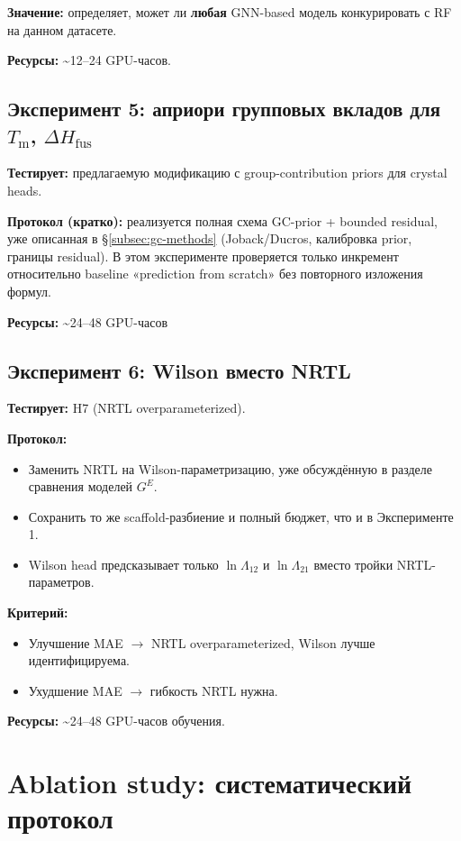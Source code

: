 \documentclass[11pt]{article}
\begin{document}
\textbf{Значение:} определяет, может ли \textbf{любая} GNN-based модель конкурировать с RF на данном датасете.

\textbf{Ресурсы:} \textasciitilde12--24 GPU-часов.

\subsection{Эксперимент 5: априори групповых вкладов для $T_{\mathrm{m}}$, $\Delta H_{\mathrm{fus}}$}
\label{subsec:exp-gc-priors}

\textbf{Тестирует:} предлагаемую модификацию с group-contribution priors для crystal heads.

\textbf{Протокол (кратко):} реализуется полная схема GC-prior + bounded residual, уже описанная в §\ref{subsec:gc-methods} (Joback/Ducros, калибровка prior, границы residual). В этом эксперименте проверяется только инкремент относительно baseline «prediction from scratch» без повторного изложения формул.

\textbf{Ресурсы:} \textasciitilde24--48 GPU-часов

\subsection{Эксперимент 6: Wilson вместо NRTL}
\label{subsec:exp-wilson}

\textbf{Тестирует:} H7 (NRTL overparameterized).

\textbf{Протокол:}
\begin{itemize}
  \item Заменить NRTL на Wilson-параметризацию, уже обсуждённую в разделе сравнения моделей $G^E$.
  \item Сохранить то же scaffold-разбиение и полный бюджет, что и в Эксперименте 1.
  \item Wilson head предсказывает только $\ln\Lambda_{12}$ и $\ln\Lambda_{21}$ вместо тройки NRTL-параметров.
\end{itemize}

\textbf{Критерий:}
\begin{itemize}
  \item Улучшение MAE $\to$ NRTL overparameterized, Wilson лучше идентифицируема.
  \item Ухудшение MAE $\to$ гибкость NRTL нужна.
\end{itemize}

\textbf{Ресурсы:} \textasciitilde24--48 GPU-часов обучения.

\section{Ablation study: систематический протокол}
\end{document}
